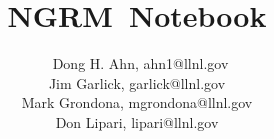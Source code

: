 \documentclass[10pt]{article}
\newcommand{\ngrm}{NGRM}
\begin{document}
\title{\ngrm\ Notebook}
\author{\
Dong H. Ahn, ahn1@llnl.gov\\
Jim Garlick, garlick@llnl.gov\\
Mark Grondona, mgrondona@llnl.gov\\
Don Lipari, lipari@llnl.gov}






%
%
\end{document}
